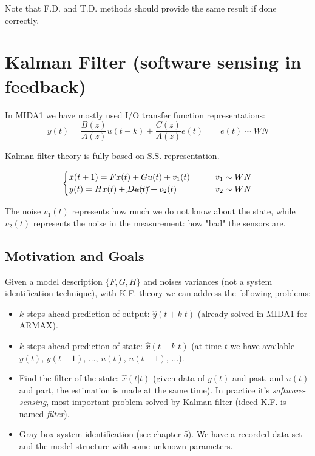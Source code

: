 Note that F.D. and T.D. methods should provide the same result if done correctly.


\chapter{Kalman Filter (software sensing in feedback)}

In MIDA1 we have mostly used I/O transfer function representations:
\[ y(t) = \frac{B(z)}{A(z)}u(t-k) + \frac{C(z)}{A(z)}e(t) \qquad e(t) \sim WN \]


Kalman filter theory is fully based on S.S. representation.

\[
    \begin{cases}
        x(t+1) = Fx(t) + Gu(t) + v_1(t)  & \qquad v_1 \sim WN \\
        y(t) = Hx(t) + \cancel{Du(t)} + v_2(t) & \qquad v_2 \sim WN
    \end{cases}
\]

The noise $v_1(t)$ represents how much we do not know about the state, while $v_2(t)$ represents the noise in the measurement: how "bad" the sensors are.

\section{Motivation and Goals}

Given a model description $\{F, G, H\}$ and noises variances (not a system identification technique), with K.F. theory we can address the following problems:

\begin{itemize}
    \item $k$-steps ahead prediction of output: $\hat{y}(t+k|t)$ (already solved in MIDA1 for ARMAX).
    \item $k$-steps ahead prediction of state: $\hat{x}(t+k|t)$ (at time $t$ we have available $y(t)$, $y(t-1)$, $\ldots$, $u(t)$, $u(t-1)$, $\ldots$).
    \item Find the filter of the state: $\hat{x}(t|t)$ (given data of $y(t)$ and past, and $u(t)$ and part, the estimation is made at the same time). In practice it's \emph{software-sensing}, most important problem solved by Kalman filter (ideed K.F. is named \emph{filter}).
    \item Gray box system identification (see chapter 5). We have a recorded data set and the model structure with some unknown parameters.
\end{itemize}


